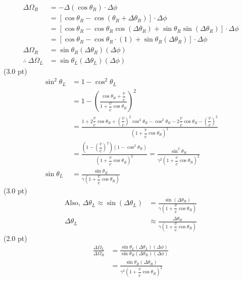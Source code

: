 \begin{description}
\begin{align*}
    \Delta\Omega_R &= -\Delta(\cos\theta_R)\cdot\Delta\phi\\
    &= \left[\cos\theta_R - \cos(\theta_R + \Delta\theta_R)\right]
       \cdot\Delta\phi\\
    &= \left[\cos\theta_R - \cos\theta_R\cos(\Delta\theta_R)
       + \sin\theta_R\sin(\Delta\theta_R)\right]\cdot\Delta\phi\\
    &= \left[\cos\theta_R - \cos\theta_R\cdot(1)
       + \sin\theta_R(\Delta\theta_R)\right]\cdot\Delta\phi\\
    \Delta\Omega_R &= \sin\theta_R(\Delta\theta_R)(\Delta\phi)\\
    \therefore\ \Delta\Omega_L &= \sin\theta_L(\Delta\theta_L)(\Delta\phi)
  \end{align*}
  \hfill(3.0 pt)
  \begin{align*}
    \sin^2\theta_L &= 1 - \cos^2\theta_L\\
    &= 1 - \left(\frac{\cos\theta_R + \dfrac{v}{c}}
        {1 + \dfrac{v}{c}\cos\theta_R}\right)^2\\
    &= \frac{1 + 2\dfrac{v}{c}\cos\theta_R
        + \left(\dfrac{v}{c}\right)^2\cos^2\theta_R - \cos^2\theta_R
        - 2\dfrac{v}{c}\cos\theta_R - \left(\dfrac{v}{c}\right)^2}
        {\left(1 + \dfrac{v}{c}\cos\theta_R\right)^2}\\
    &= \frac{\left(1 - \left(\dfrac{v}{c}\right)^2\right)
        \left(1 - \cos^2\theta_R\right)}
        {\left(1 + \dfrac{v}{c}\cos\theta_R\right)^2}
     = \frac{\sin^2\theta_R}
        {\gamma^2\left(1 + \dfrac{v}{c}\cos\theta_R\right)^2}\\
    \sin\theta_L &= \frac{\sin\theta_R}
        {\gamma\left(1 + \dfrac{v}{c}\cos\theta_R\right)}
  \end{align*}
  \hfill(3.0 pt)
  \begin{align*}
    \text{Also, } \Delta\theta_L \approx \sin(\Delta\theta_L)
      &= \frac{\sin(\Delta\theta_R)}
         {\gamma\left(1 + \dfrac{v}{c}\cos\theta_R\right)}\\
    \Delta\theta_L &\approx \frac{\Delta\theta_R}
      {\gamma\left(1 + \dfrac{v}{c}\cos\theta_R\right)}
  \end{align*}
  \hfill(2.0 pt)
  \begin{align*}
    \frac{\Delta\Omega_L}{\Delta\Omega_R}
      &= \frac{\sin\theta_L(\Delta\theta_L)(\Delta\phi)}
              {\sin\theta_R(\Delta\theta_R)(\Delta\phi)}\\
      &= \frac{\sin\theta_R(\Delta\theta_R)}
              {\gamma^2\left(1 + \dfrac{v}{c}\cos\theta_R\right)^2}

\end{align*}
\end{description}
